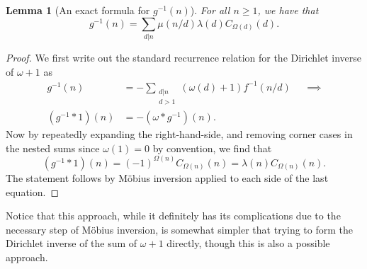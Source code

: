 \documentclass[11pt,reqno,a4letter]{article}
\numberwithin{figure}{section}
\numberwithin{table}{section}
\theoremstyle{plain}
\newtheorem{lemma}[theorem]{Lemma}
\numberwithin{theorem}{section}
\theoremstyle{definition}
\begin{document}
\begin{lemma}[An exact formula for $g^{-1}(n)$] 
\label{lemma_AnExactFormulaFor_gInvByMobiusInv_v1} 
For all $n \geq 1$, we have that 
\[
g^{-1}(n) = \sum_{d|n} \mu(n/d) \lambda(d) C_{\Omega(d)}(d). 
\]
\end{lemma}
\begin{proof} 
We first write out the standard recurrence relation for the Dirichlet inverse of 
$\omega+1$ as 
\begin{align*} 
g^{-1}(n) & = - \sum_{\substack{d|n \\ d>1}} (\omega(d) + 1) f^{-1}(n/d) && \implies \\ 
     (g^{-1} \ast 1)(n) & = -(\omega \ast g^{-1})(n). 
\end{align*} 
Now by repeatedly expanding the right-hand-side, and removing corner cases in the nested sums since 
$\omega(1) = 0$ by convention, we find that 
\[
(g^{-1} \ast 1)(n) = (-1)^{\Omega(n)} C_{\Omega(n)}(n) = \lambda(n) C_{\Omega(n)}(n). 
\]
The statement follows by M\"obius inversion applied to each side of the last equation. 
\end{proof}

Notice that this approach, while it definitely has its complications due to the necessary step of 
M\"obius inversion, is somewhat simpler that trying to form the Dirichlet inverse of the sum of 
$\omega+1$ directly, though this is also a possible approach. 
\end{document}
